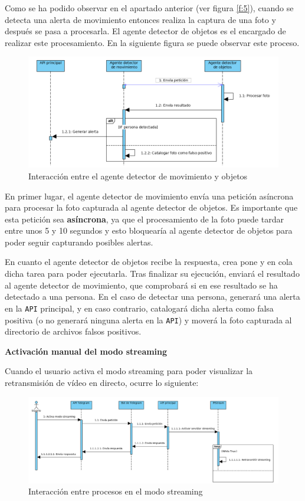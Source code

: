 Como se ha podido observar en el apartado anterior (ver figura \ref{f:5}), cuando se detecta una alerta de movimiento entonces realiza la captura de una foto y después se pasa a procesarla. El agente detector de objetos es el encargado de realizar este procesamiento. En la siguiente figura se puede observar este proceso.

\begin{figure}[H]
	\centering
	\includegraphics[scale=0.42]{images/90}
	\caption{Interacción entre el agente detector de movimiento y objetos}
	\label{f:6}
\end{figure}

En primer lugar, el agente detector de movimiento envía una petición asíncrona para procesar la foto capturada al agente detector de objetos. Es importante que esta petición sea \textbf{asíncrona}, ya que el procesamiento de la foto puede tardar entre unos 5 y 10 segundos y esto bloquearía al agente detector de objetos para poder seguir capturando posibles alertas.

En cuanto el agente detector de objetos recibe la respuesta, crea pone y en cola dicha tarea para poder ejecutarla. Tras finalizar su ejecución, enviará el resultado al agente detector de movimiento, que comprobará si en ese resultado se ha detectado a una persona. En el caso de detectar una persona, generará una alerta en la \texttt{API} principal, y en caso contrario, catalogará dicha alerta como falsa positiva (o no generará ninguna alerta en la \texttt{API}) y moverá la foto capturada al directorio de archivos falsos positivos.

\textbf{Activación manual del modo streaming}

Cuando el usuario activa el modo streaming para poder visualizar la retransmisión de vídeo en directo, ocurre lo siguiente:

\begin{figure}[H]
	\centering
	\includegraphics[scale=0.42]{images/89}
	\caption{Interacción entre procesos en el modo streaming}
	\label{f:7}
\end{figure}

